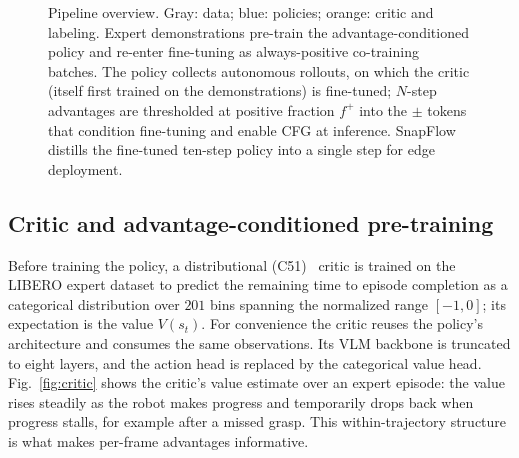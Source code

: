 \documentclass[conference]{IEEEtran}
\newcommand{\pf}{\ensuremath{f^{+}}}   %
\begin{document}
\begin{figure}[t]
\centering
{}
\caption{Pipeline overview. Gray: data; blue: policies; orange: critic and labeling.
Expert demonstrations pre-train the advantage-conditioned policy and re-enter fine-tuning
as always-positive co-training batches. The policy collects autonomous rollouts, on which
the critic (itself first trained on the demonstrations) is fine-tuned; $N$-step advantages
are thresholded at positive fraction \pf{} into the $\pm$ tokens that condition
fine-tuning and enable CFG at inference. SnapFlow distills the fine-tuned ten-step policy
into a single step for edge deployment.}
\label{fig:arch}
\end{figure}

\subsection{Critic and advantage-conditioned pre-training}\label{sec:pretrain}
Before training the policy, a distributional (C51)~\cite{b_c51} critic is trained on the
LIBERO expert dataset to predict the remaining time to episode completion as a categorical
distribution over $201$ bins spanning the normalized range $[-1,0]$; its expectation is the
value $V(s_t)$. For convenience the critic reuses the policy's architecture and consumes
the same observations. Its VLM backbone is truncated to eight layers, and the action head
is replaced by the categorical value head. Fig.~\ref{fig:critic} shows the critic's value
estimate over an expert episode: the value rises steadily as the robot makes progress and
temporarily drops back when progress stalls, for example after a missed grasp. This
within-trajectory structure is what makes per-frame advantages informative.
\end{document}
